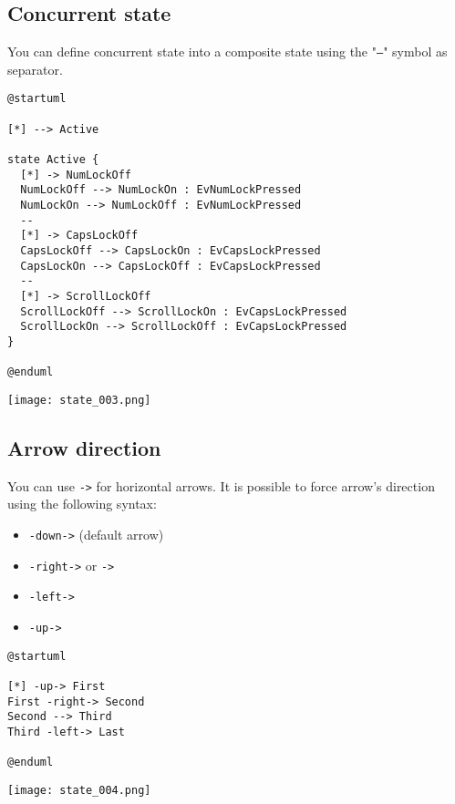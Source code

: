 \newpage \subsection{Concurrent state}

You can define concurrent state into a composite state using the "\texttt{--}"
symbol as separator.

\begin{lstlisting}
@startuml

[*] --> Active

state Active {
  [*] -> NumLockOff
  NumLockOff --> NumLockOn : EvNumLockPressed
  NumLockOn --> NumLockOff : EvNumLockPressed
  --
  [*] -> CapsLockOff
  CapsLockOff --> CapsLockOn : EvCapsLockPressed
  CapsLockOn --> CapsLockOff : EvCapsLockPressed
  --
  [*] -> ScrollLockOff
  ScrollLockOff --> ScrollLockOn : EvCapsLockPressed
  ScrollLockOn --> ScrollLockOff : EvCapsLockPressed
} 

@enduml
\end{lstlisting}
\begin{center}
\texttt{[image: state\_003.png]}
\end{center}
        
\newpage \subsection{Arrow direction}

You can use \texttt{->} for horizontal arrows. It is possible to force arrow's
direction using the following syntax:

\begin{itemize}
\item \texttt{-down->} (default arrow)
\item \texttt{-right->} or \texttt{->}
\item \texttt{-left->}
\item \texttt{-up->}
\end{itemize}

\begin{lstlisting}
@startuml

[*] -up-> First
First -right-> Second
Second --> Third
Third -left-> Last

@enduml
\end{lstlisting}
\begin{center}
\texttt{[image: state\_004.png]}
\end{center}
        
